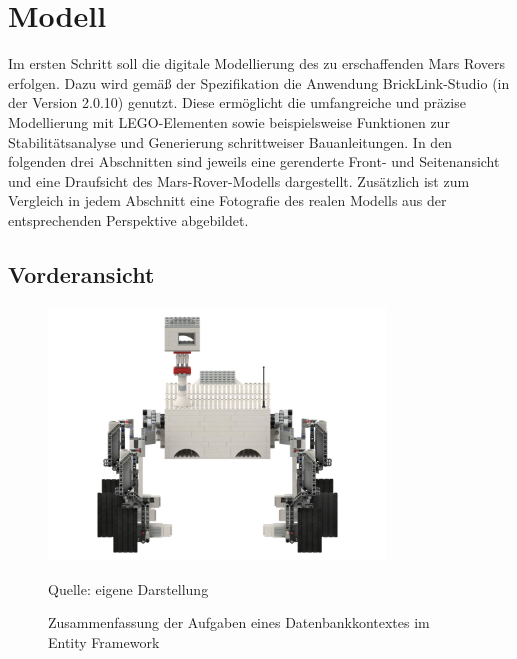 \chapter{Modell}
\label{chp:Modell}

Im ersten Schritt soll die digitale Modellierung des zu erschaffenden Mars Rovers erfolgen.
Dazu wird gemäß der Spezifikation die Anwendung BrickLink-Studio (in der Version 2.0.10) genutzt.
Diese ermöglicht die umfangreiche und präzise Modellierung mit LEGO-Elementen sowie beispielsweise Funktionen zur Stabilitätsanalyse und Generierung schrittweiser Bauanleitungen.
In den folgenden drei Abschnitten sind jeweils eine gerenderte Front- und Seitenansicht und eine Draufsicht des Mars-Rover-Modells dargestellt.
Zusätzlich ist zum Vergleich in jedem Abschnitt eine Fotografie des realen Modells aus der entsprechenden Perspektive abgebildet.

\section{Vorderansicht}
\label{sec:voderansicht}


\begin{figure}
	\centering
	\includegraphics[width=0.8\textwidth]{../Images/Mars_Rover_V5_front.png}
	\vspace{0.5em}
	\parbox[c]{0.8\linewidth}{\footnotesize
		\centering
		\vspace{1em}
		Quelle: eigene Darstellung
	}
	\caption{Zusammenfassung der Aufgaben eines Datenbankkontextes im Entity Framework}
	\label{fig:dbcontext}
\end{figure}

